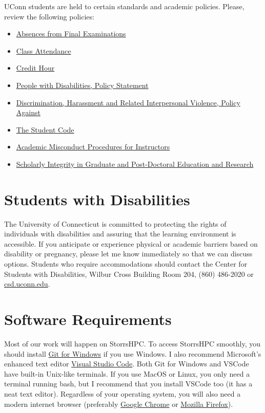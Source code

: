 \documentclass[11pt]{article}
\begin{document}
UConn students are held to certain standards and academic policies. Please, review the following policies: 
\begin{itemize}
	\item \href{https://catalog.uconn.edu/academic-regulations/grade-information/#exam-absence}{Absences from Final Examinations}
	\item \href{https://catalog.uconn.edu/academic-regulations/grade-information/#attendance}{Class Attendance}
	\item \href{https://policy.uconn.edu/2012/08/22/credit-hour/}{Credit Hour}
	\item \href{https://policy.uconn.edu/2011/05/24/people-with-disabilities-policy-statement/}{People with Disabilities, Policy Statement}
	\item \href{https://policy.uconn.edu/2015/12/29/policy-against-discrimination-harassment-and-related-interpersonal-violence/}{Discrimination, Harassment and Related Interpersonal Violence, Policy Against}
	\item \href{https://community.uconn.edu/the-student-code-preamble/}{The Student Code}
	\item \href{https://community.uconn.edu/academic-misconduct-procedure-review/}{Academic Misconduct Procedures for Instructors}
	\item \href{https://policy.uconn.edu/2014/04/11/policy-on-scholarly-integrity-in-graduate-education-and-research/}{Scholarly Integrity in Graduate and Post-Doctoral Education and Research}
\end{itemize}

\section*{Students with Disabilities}

The University of Connecticut is committed to protecting the rights of individuals with disabilities and assuring that the learning environment is accessible. If you anticipate or experience physical or academic barriers based on disability or pregnancy, please let me know immediately so that we can discuss options. Students who require accommodations should contact the Center for Students with Disabilities, Wilbur Cross Building Room 204, (860) 486-2020 or \href{http://csd.uconn.edu}{csd.uconn.edu}.

\section*{Software Requirements}
Most of our work will happen on StorrsHPC. To access StorrsHPC smoothly, you should install \href{https://gitforwindows.org}{Git for Windows} if you use Windows. I also recommend Microsoft's enhanced text editor \href{https://code.visualstudio.com}{Visual Studio Code}. Both Git for Windows and VSCode have built-in Unix-like terminals. If you use MacOS or Linux, you only need a terminal running bash, but I recommend that you install VSCode too (it has a neat text editor). Regardless of your operating system, you will also need a modern internet browser (preferably \href{https://www.google.com/chrome/}{Google Chrome} or  \href{https://www.mozilla.org/en-US/firefox/new/}{Mozilla Firefox}).
\end{document}
